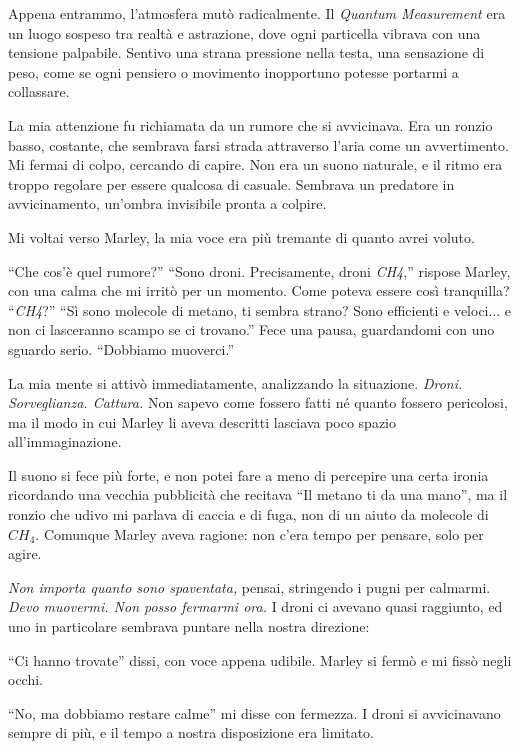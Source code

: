 Appena entrammo, l'atmosfera mutò radicalmente. Il \textit{Quantum Measurement} era un luogo sospeso tra realtà e astrazione, dove ogni particella vibrava con una tensione palpabile. Sentivo una strana pressione nella testa, una sensazione di peso, come se ogni pensiero o movimento inopportuno potesse portarmi a collassare.

La mia attenzione fu richiamata da un rumore che si avvicinava. Era un ronzio basso, costante, che sembrava farsi strada attraverso l'aria come un avvertimento. Mi fermai di colpo, cercando di capire. Non era un suono naturale, e il ritmo era troppo regolare per essere qualcosa di casuale. Sembrava un predatore in avvicinamento, un'ombra invisibile pronta a colpire.

Mi voltai verso Marley, la mia voce era più tremante di quanto avrei voluto.

\begin{dialogue}  \enquote{Che cos’è quel rumore?}  \enquote{Sono droni. Precisamente, droni \textit{CH4},} rispose Marley, con una calma che mi irritò per un momento. Come poteva essere così tranquilla?  \enquote{\textit{CH4}?}  \enquote{Sì sono molecole di metano, ti sembra strano? Sono efficienti e veloci... e non ci lasceranno scampo se ci trovano.} Fece una pausa, guardandomi con uno sguardo serio. \enquote{Dobbiamo muoverci.} \end{dialogue}

La mia mente si attivò immediatamente, analizzando la situazione. \textit{Droni. Sorveglianza. Cattura.} Non sapevo come fossero fatti né quanto fossero pericolosi, ma il modo in cui Marley li aveva descritti lasciava poco spazio all’immaginazione. 

Il suono si fece più forte, e non potei fare a meno di percepire una certa ironia ricordando una vecchia pubblicità che recitava ``Il metano ti da una mano'',  ma il ronzio che udivo mi parlava di caccia e di fuga, non di un aiuto da molecole di $CH_4$. Comunque Marley aveva ragione: non c’era tempo per pensare, solo per agire.

\textit{Non importa quanto sono spaventata,} pensai, stringendo i pugni per calmarmi. \textit{Devo muovermi. Non posso fermarmi ora.}
I droni ci avevano quasi raggiunto, ed uno in particolare sembrava puntare nella nostra direzione:

\enquote{Ci hanno trovate} dissi, con  voce appena udibile. Marley si fermò e mi fissò negli occhi.

\enquote{No, ma dobbiamo restare calme} mi disse con  fermezza. I droni si avvicinavano sempre di più, e il tempo a nostra disposizione era limitato. 

